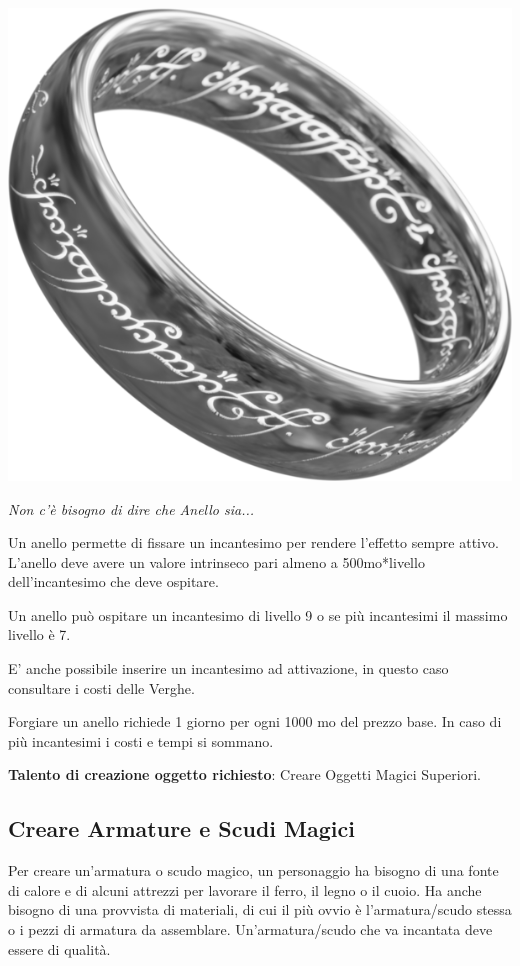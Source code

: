 \begin{multicols}{2}
	\begin{center}
		\includegraphics[width=0.5\linewidth]{immagini/onering2.png}

		\textit{Non c'è bisogno di dire che Anello sia...}
	\end{center}

	Un anello permette di fissare un incantesimo per rendere l'effetto sempre attivo.
	L'anello deve avere un valore intrinseco pari almeno a 500mo*livello dell'incantesimo che deve ospitare.

	Un anello può ospitare un incantesimo di livello 9 o se più incantesimi il massimo livello è 7.

	E' anche possibile inserire un incantesimo ad attivazione, in questo caso consultare i costi delle Verghe.

	Forgiare un anello richiede 1 giorno per ogni 1000 mo del prezzo base. In caso di più incantesimi i costi e tempi si sommano.

	\medskip

	\textbf{Talento di creazione oggetto richiesto}: Creare Oggetti Magici Superiori.

	\subsection{Creare Armature e Scudi Magici}

	Per creare un'armatura o scudo magico, un personaggio ha bisogno di una fonte di calore e di alcuni attrezzi per lavorare il ferro, il legno o il cuoio. Ha anche bisogno di una provvista di materiali, di cui il più ovvio è l'armatura/scudo stessa o i pezzi di armatura da assemblare. Un'armatura/scudo che va incantata deve essere di qualità.


\end{multicols}
